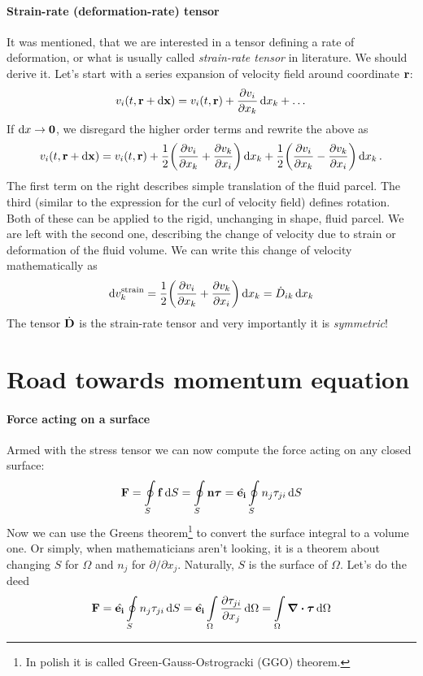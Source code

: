 \documentclass[a4paper]{article}
\begin{document}
\paragraph{Strain-rate (deformation-rate) tensor}
It was mentioned, that we are interested in a tensor defining a rate of 
deformation, or what is usually called \emph{strain-rate tensor} in 
literature. We should derive it. Let's start with a series expansion of 
velocity field around coordinate \(\vb{r}\):
\[
  v_i(t, \vb{r} + \dd{\vb{x}}) = v_i(t, \vb{r}) + \pdv{v_i}{x_k}\dd{x_k}
  + \dots
\]
If \(\dd{x}\rightarrow\vb{0}\), we disregard the higher order terms and 
rewrite the above as 
\[
  v_i(t, \vb{r} + \dd{\vb{x}}) = v_i(t, \vb{r}) 
  + \frac{1}{2}\qty(\pdv{v_i}{x_k} + \pdv{v_k}{x_i})\dd{x_k}
  + \frac{1}{2}\qty(\pdv{v_i}{x_k} - \pdv{v_k}{x_i})\dd{x_k}.
\]
The first term on the right describes simple translation of the fluid parcel.
The third (similar to the expression for the curl of velocity field) defines
rotation. Both of these can be applied to the rigid, unchanging in shape, 
fluid parcel. We are left with the second one, describing the change of 
velocity due to  strain or deformation of the fluid volume. 
We can write this change of velocity mathematically as
\begin{equation}\label{eq::strain_rate_tensor}
  \dd{v^\mathrm{strain}_k} 
  = \frac{1}{2}\qty(\pdv{v_i}{x_k} + \pdv{v_k}{x_i})\dd{x_k}
  = \dot{D}_{ik}\dd{x_k}
\end{equation}
The tensor \(\dot{\vb{D}}\) is the strain-rate tensor and very importantly 
it is \emph{symmetric}!

\section{Road towards momentum equation}

\paragraph{Force acting on a surface}
Armed with the stress tensor we can now compute the force acting on any 
closed surface:
\[
  \vb{F} = \oint\limits_S \vb{f} \dd{S} 
  = \oint\limits_S \vb{n}\bm{\tau} 
  = \hat{\vb{e_i}}\oint\limits_S n_j \tau_{ji}\dd{S}
\]
Now we can use the Greens theorem\footnote{In polish it is called 
Green-Gauss-Ostrogracki (GGO) theorem.} to convert the surface integral 
to a volume one. Or simply, when mathematicians aren't looking, it is 
a theorem about changing \(S\) for \(\Omega\) and \(n_j\) for 
\(\partial/\partial x_j\). Naturally, \(S\) is the surface of \(\Omega\). 
Let's do the deed
\[
  \vb{F} 
  = \hat{\vb{e_i}}\oint\limits_S n_j \tau_{ji}\dd{S}
  = \hat{\vb{e_i}}\int\limits_\Omega \pdv{\tau_{ji}}{x_j}\dd{\Omega}
  = \int\limits_\Omega \div\bm{\tau} \dd{\Omega}
\]
\end{document}
